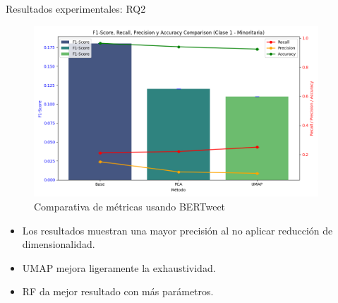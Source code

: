 \documentclass[final]{beamer}
\newlength{\sepwid}
\newlength{\onecolwid}
\begin{document}
\begin{frame}[t]
\begin{columns}[t]
\begin{column}{\sepwid}\end{column} %
\begin{column}{\onecolwid} %

\begin{block}{Resultados experimentales: RQ2}

    \begin{figure}
        \centering
        \includegraphics[width=1\linewidth]{f1_recall_precision_comparison.png}
        \caption{Comparativa de métricas usando BERTweet}
        \label{fig:metricas}
    \end{figure}
    
    \begin{itemize}
    \item Los resultados muestran una mayor precisión al no aplicar reducción de dimensionalidad.
    \item UMAP mejora ligeramente la exhaustividad.
    \item RF da mejor resultado con más parámetros.
    \end{itemize}
\end{block}






\end{column}
\end{columns}
\end{frame}
\end{document}
